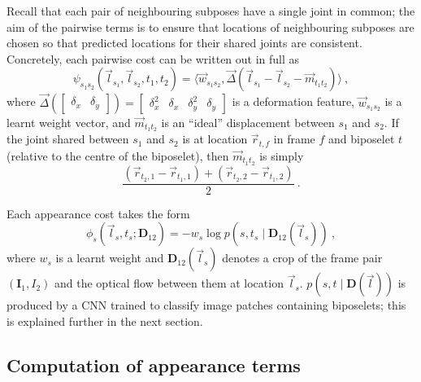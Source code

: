\documentclass[runningheads]{llncs}
\newcommand{\mat}{\mathbf}
\begin{document}
Recall that each pair of neighbouring subposes have a single joint in common;
the aim of the pairwise terms is to ensure that locations of neighbouring
subposes are chosen so that predicted locations for their shared joints are
consistent. Concretely, each pairwise cost can be written out in full as
%
\begin{equation}\label{eqn:pair-cost}
\psi_{s_1 s_2}(\vec l_{s_1}, \vec l_{s_2}, t_1, t_2)
= \langle
    \vec w_{s_1 s_2},
    \vec \Delta(\vec l_{s_1} - \vec l_{s_2}  - \vec m_{t_1 t_2})
\rangle~,
\end{equation}
%
where $\vec \Delta(\begin{bmatrix}\delta_x & \delta_y\end{bmatrix}) =
\begin{bmatrix}\delta_x^2 & \delta_x & \delta_y^2 & \delta_y\end{bmatrix}$ is a
deformation feature, $\vec w_{s_1 s_2}$ is a learnt weight vector, and
$\vec m_{t_1 t_2}$ is an ``ideal'' displacement between $s_1$ and $s_2$. If the
joint shared between $s_1$ and $s_2$ is at location $\vec r_{t,f}$ in frame $f$
and biposelet $t$ (relative to the centre of the biposelet), then $\vec m_{t_1
t_2}$ is simply
\begin{equation}
\frac{
    \left(\vec r_{t_2,1} - \vec r_{t_1,1}\right)
    + \left(\vec r_{t_2,2} - \vec r_{t_1,2}\right)
}{2}~.
\end{equation}

Each appearance cost takes the form
\begin{equation}\label{eqn:unary-cost}
\phi_s(\vec l_s, t_s; \mat D_{12}) = -w_s \log p(s, t_s \mid \mat D_{12}(\vec
l_s))~,
\end{equation}
%
where $w_s$ is a learnt weight and $\mat D_{12}(\vec l_s)$ denotes a crop of the
frame pair $(\mat I_1, I_2)$ and the optical flow between them at location $\vec
l_s$. $p(s, t \mid \mat D(\vec l))$ is produced by a CNN trained to classify
image patches containing biposelets; this is explained further in the next
section.

\subsection{Computation of appearance terms}
\label{sec:unaries}

\end{document}
